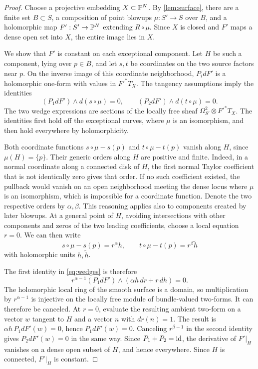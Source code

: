 \begin{proof}
Choose a projective embedding \(X\subset\mathbb P^N\).
By \cref{lem:surface}, there are a finite set \(B\subset S\), a
composition of point blowups \(\mu:S'\to S\) over \(B\), and a
holomorphic map \(F':S'\to\mathbb P^N\) extending \(R\circ\mu\).
Since \(X\) is closed and \(F'\) maps a dense open set into \(X\),
the entire image lies in \(X\).

We show that \(F'\) is constant on each exceptional component.
Let \(H\) be such a component, lying over \(p\in B\), and let
\(s,t\) be coordinates on the two source factors near \(p\).
On the inverse image of this coordinate neighborhood,
\(P_i dF'\) is a holomorphic one-form with values in \(F'^*T_X\).
The tangency assumptions imply the identities
\begin{equation}\label{eq:wedges}
(P_1dF')\wedge d(s\circ\mu)=0,\qquad
(P_2dF')\wedge d(t\circ\mu)=0.
\end{equation}
The two wedge expressions are sections of the locally free sheaf
\(\Omega^2_{S'}\otimes F'^*T_X\). The identities first hold off
the exceptional curves, where \(\mu\) is an isomorphism, and then
hold everywhere by holomorphicity.

Both coordinate functions \(s\circ\mu-s(p)\) and
\(t\circ\mu-t(p)\) vanish along \(H\), since \(\mu(H)=\{p\}\).
Their generic orders along \(H\) are positive and finite. Indeed,
in a normal coordinate along a connected disk of \(H\), the first
normal Taylor coefficient that is not identically zero gives that
order. If no such coefficient existed, the pullback would vanish on
an open neighborhood meeting the dense locus where \(\mu\) is an
isomorphism, which is impossible for a coordinate function. Denote
the two respective orders by \(\alpha,\beta\). This reasoning
applies also to components created by later blowups.
At a general point of \(H\), avoiding intersections with other
components and zeros of the two leading coefficients, choose a
local equation \(r=0\). We can then write
\[
s\circ\mu-s(p)=r^\alpha h,\qquad
t\circ\mu-t(p)=r^\beta\widetilde h
\]
with holomorphic units \(h,\widetilde h\).

The first identity in \eqref{eq:wedges} is therefore
\[
r^{\alpha-1}(P_1dF')\wedge(\alpha h\,dr+r\,dh)=0.
\]
The holomorphic local ring of the smooth surface is a domain, so
multiplication by \(r^{\alpha-1}\) is injective on the locally free
module of bundle-valued two-forms. It can therefore be canceled.
At \(r=0\),
evaluate the resulting ambient two-form on a vector \(w\) tangent
to \(H\) and a vector \(n\) with \(dr(n)=1\). The result is
\(\alpha h\,P_1dF'(w)=0\), hence \(P_1dF'(w)=0\).
Canceling \(r^{\beta-1}\) in the second identity gives
\(P_2dF'(w)=0\) in the same way. Since \(P_1+P_2=\operatorname{id}\), the
derivative of \(F'|_H\) vanishes on a dense open subset of \(H\),
and hence everywhere. Since \(H\) is connected, \(F'|_H\) is constant.


\end{proof}
